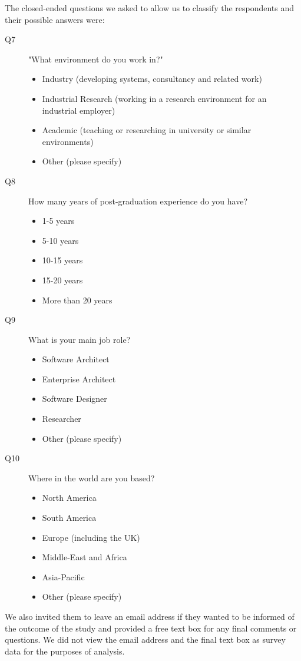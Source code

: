 The closed-ended questions we asked to allow us to classify the respondents and their possible answers were:
\begin{description}
   \item [Q7] "What environment do you work in?"
	\begin{itemize}
		\item Industry (developing systems, consultancy and related work)
		\item Industrial Research (working in a research environment for an industrial employer) 
		\item Academic (teaching or researching in university or similar environments)
		\item Other (please specify)
	\end{itemize}
	\item [Q8] How many years of post-graduation experience do you have?   
   \begin{itemize}
		\item 1-5 years
		\item 5-10 years
		\item 10-15 years
		\item 15-20 years
		\item More than 20 years
    \end{itemize}
   \item [Q9] What is your main job role? \nolinebreak
	\begin{itemize}
		\item Software Architect
		\item Enterprise Architect
		\item Software Designer
		\item Researcher
		\item Other (please specify)
    \end{itemize}
	\item [Q10] Where in the world are you based?
	\begin{itemize}
		\item North America
		\item South America 
		\item Europe (including the UK) 
		\item Middle-East and Africa 
		\item Asia-Pacific
		\item Other (please specify)
	\end{itemize}
\end{description}

We also invited them to leave an email address if they wanted to be informed of the outcome of the study and provided a free text box for any final comments or questions.  We did not view the email address and the final text box as survey data for the purposes of analysis.

